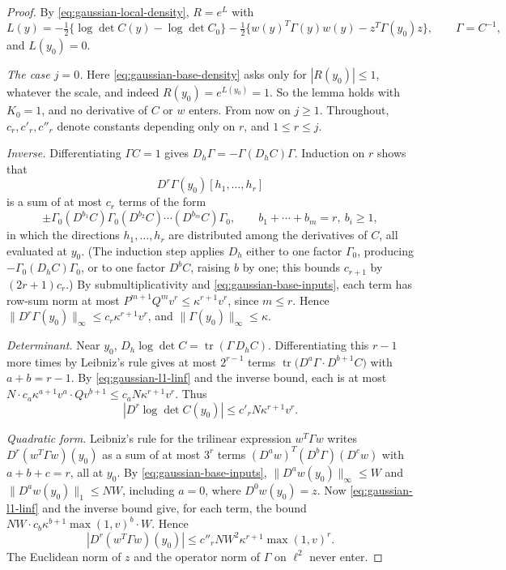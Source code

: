 \begin{proof}
By \eqref{eq:gaussian-local-density}, $R=e^L$ with
\[
 L(y)=-\tfrac12\{\log\det C(y)-\log\det C_0\}
      -\tfrac12\{w(y)^T\Gamma(y)w(y)-z^T\Gamma(y_0)z\},
 \qquad \Gamma=C^{-1},
\]
and $L(y_0)=0$.

\emph{The case $j=0$.} Here \eqref{eq:gaussian-base-density} asks only
for $|R(y_0)|\le1$, whatever the scale, and indeed $R(y_0)=e^{L(y_0)}=1$.
So the lemma holds with $K_0=1$, and no derivative of $C$ or $w$ enters.
From now on $j\ge1$. Throughout, $c_r,c'_r,c''_r$ denote constants
depending only on $r$, and $1\le r\le j$.

\emph{Inverse.} Differentiating $\Gamma C=1$ gives
$D_h\Gamma=-\Gamma(D_hC)\Gamma$. Induction on $r$ shows that
\[
 D^r\Gamma(y_0)[h_1,\ldots,h_r]
\]
is a sum of at most $c_r$ terms of the
form
\[
 \pm\Gamma_0(D^{b_1}C)\Gamma_0(D^{b_2}C)\cdots(D^{b_m}C)\Gamma_0,
 \qquad b_1+\cdots+b_m=r,\ b_i\ge1,
\]
in which the directions $h_1,\ldots,h_r$ are distributed among the
derivatives of $C$, all evaluated at $y_0$. (The induction step applies
$D_h$ either to one factor $\Gamma_0$, producing
$-\Gamma_0(D_hC)\Gamma_0$, or to one factor $D^{b}C$, raising $b$ by
one; this bounds $c_{r+1}$ by $(2r+1)c_r$.) By submultiplicativity and
\eqref{eq:gaussian-base-inputs}, each term has row-sum norm at most
$P^{m+1}Q^mv^r\le\kappa^{r+1}v^r$, since $m\le r$. Hence
$\|D^r\Gamma(y_0)\|_\infty\le c_r\kappa^{r+1}v^r$, and
$\|\Gamma(y_0)\|_\infty\le\kappa$.

\emph{Determinant.} Near $y_0$,
$D_h\log\det C=\operatorname{tr}(\Gamma\,D_hC)$. Differentiating this
$r-1$ more times by Leibniz's rule gives at most $2^{r-1}$ terms
$\operatorname{tr}\bigl(D^a\Gamma\cdot D^{b+1}C\bigr)$ with $a+b=r-1$.
By \eqref{eq:gaussian-l1-linf} and the inverse bound, each is at most
$N\cdot c_a\kappa^{a+1}v^a\cdot Qv^{b+1}\le c_aN\kappa^{r+1}v^r$.
Thus
\[
 |D^r\log\det C(y_0)|\le c'_rN\kappa^{r+1}v^r .
\]

\emph{Quadratic form.} Leibniz's rule for the trilinear expression
$w^T\Gamma w$ writes $D^r(w^T\Gamma w)(y_0)$ as a sum of at most $3^r$
terms $(D^aw)^T(D^b\Gamma)(D^cw)$ with $a+b+c=r$, all at $y_0$.
By \eqref{eq:gaussian-base-inputs}, $\|D^aw(y_0)\|_\infty\le W$ and
$\|D^aw(y_0)\|_1\le NW$, including $a=0$, where $D^0w(y_0)=z$. Now
\eqref{eq:gaussian-l1-linf} and the inverse bound give, for each term,
the bound $NW\cdot c_b\kappa^{b+1}\max(1,v)^b\cdot W$. Hence
\[
 |D^r(w^T\Gamma w)(y_0)|\le c''_rN W^2\kappa^{r+1}\max(1,v)^r .
\]
The Euclidean norm of $z$ and the operator norm of $\Gamma$ on
$\ell^2$ never enter.


\end{proof}
